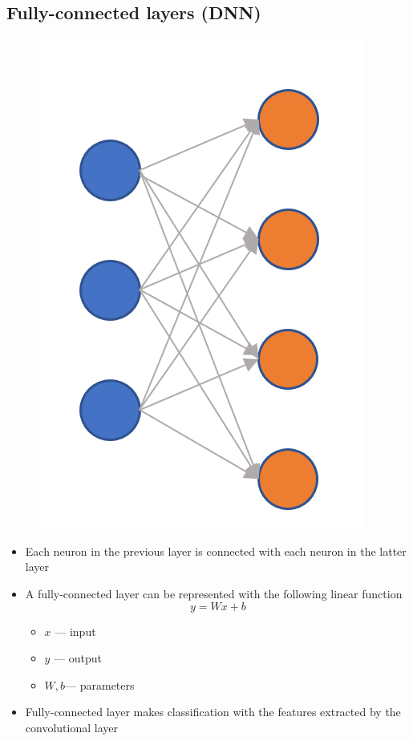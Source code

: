 \subsection{Fully-connected layers (DNN)}
\begin{figure}[H]
\centering
\includegraphics[width=.4\textwidth]{figures/FC}
\end{figure}

\begin{minipage}[c][0.45\textheight][c]{\linewidth}
\begin{itemize}
\item Each neuron in the previous layer is connected with each neuron in the latter layer
\item A fully-connected layer can be represented with the following linear function
$$y=Wx+b$$
\begin{itemize}
\item $x$ --- input
\item $y$ --- output
\item $W,b$--- parameters

\end{itemize}
\item Fully-connected layer makes classification with the features extracted by the convolutional layer

\end{itemize}

\end{minipage}



